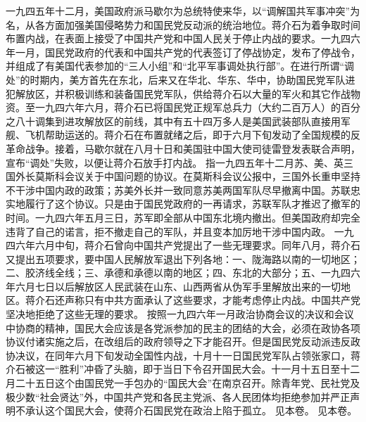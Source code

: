 \begin{maonote}
一九四五年十二月，美国政府派马歇尔为总统特使来华，以“调解国共军事冲突”为名，从各方面加强美国侵略势力和国民党反动派的统治地位。蒋介石为着争取时间布置内战，在表面上接受了中国共产党和中国人民关于停止内战的要求。一九四六年一月，国民党政府的代表和中国共产党的代表签订了停战协定，发布了停战令，并组成了有美国代表参加的“三人小组”和“北平军事调处执行部”。在进行所谓“调处”的时期内，美方首先在东北，后来又在华北、华东、华中，协助国民党军队进犯解放区，并积极训练和装备国民党军队，供给蒋介石以大量的军火和其它作战物资。至一九四六年六月，蒋介石已将国民党正规军总兵力（大约二百万人）的百分之八十调集到进攻解放区的前线，其中有五十四万多人是美国武装部队直接用军舰、飞机帮助运送的。蒋介石在布置就绪之后，即于六月下旬发动了全国规模的反革命战争。接着，马歇尔就在八月十日和美国驻中国大使司徒雷登发表联合声明，宣布“调处”失败，以便让蒋介石放手打内战。
指一九四五年十二月苏、美、英三国外长莫斯科会议关于中国问题的协议。在莫斯科会议公报中，三国外长重申坚持不干涉中国内政的政策；苏美外长并一致同意苏美两国军队尽早撤离中国。苏联忠实地履行了这个协议。只是由于国民党政府的一再请求，苏联军队才推迟了撤军的时间。一九四六年五月三日，苏军即全部从中国东北境内撤出。但美国政府却完全违背了自己的诺言，拒不撤走自己的军队，并且变本加厉地干涉中国内政。
一九四六年六月中旬，蒋介石曾向中国共产党提出了一些无理要求。同年八月，蒋介石又提出五项要求，要中国人民解放军退出下列各地：一、陇海路以南的一切地区；二、胶济线全线；三、承德和承德以南的地区；四、东北的大部分；五、一九四六年六月七日以后解放区人民武装在山东、山西两省从伪军手里解放出来的一切地区。蒋介石还声称只有中共方面承认了这些要求，才能考虑停止内战。中国共产党坚决地拒绝了这些无理的要求。
按照一九四六年一月政治协商会议的决议和会议中协商的精神，国民大会应该是各党派参加的民主的团结的大会，必须在政协各项协议付诸实施之后，在改组后的政府领导之下才能召开。但是国民党反动派违反政协决议，在同年六月下旬发动全国性内战，十月十一日国民党军队占领张家口，蒋介石被这一“胜利”冲昏了头脑，即于当日下令召开国民大会。十一月十五日至十二月二十五日这个由国民党一手包办的“国民大会”在南京召开。除青年党、民社党及极少数“社会贤达”外，中国共产党和各民主党派、各人民团体均拒绝参加并严正声明不承认这个国民大会，使蒋介石国民党在政治上陷于孤立。
见本卷。
见本卷。
\end{maonote}

